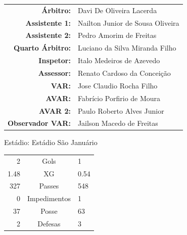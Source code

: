 \documentclass[11pt]{article}
\begin{document}
\vspace{0.5cm}
\begin{minipage}{0.65\textwidth}
\begin{center}
\begin{tabular}{rl}
\textbf{Árbitro:} & Davi De Oliveira Lacerda \\
\textbf{Assistente 1:} & Nailton Junior de Sousa Oliveira \\
\textbf{Assistente 2:} & Pedro Amorim de Freitas \\
\textbf{Quarto Árbitro:} & Luciano da Silva Miranda Filho \\
\textbf{Inspetor:} & Italo Medeiros de Azevedo \\
\textbf{Assessor:} & Renato Cardoso da Conceição \\
\textbf{VAR:} & Jose Claudio Rocha Filho \\
\textbf{AVAR:} & Fabrício Porfirio de Moura \\
\textbf{AVAR 2:} & Paulo Roberto Alves Junior \\
\textbf{Observador VAR:} & Jailson Macedo de Freitas \\
\end{tabular}
\end{center}
\end{minipage}
\begin{minipage}{0.3\textwidth}
Estádio: Estádio São Januário\\
\begin{tabular}{rcl}
2 & Gols & 1 \\
1.48 & XG & 0.54 \\
327 & Passes & 548 \\
0 & Impedimentos & 1 \\
37 & Posse & 63 \\
2 & Defesas & 3 \\
\end{tabular}
\end{minipage}
\newpage
\end{document}
